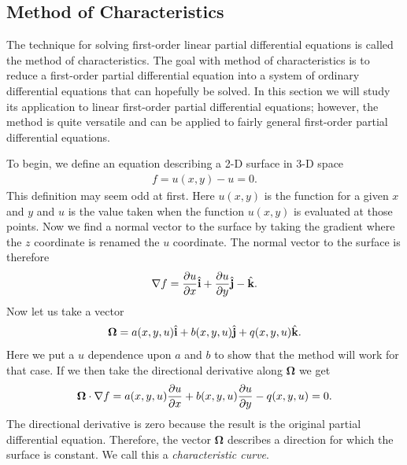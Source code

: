 \subsection{Method of Characteristics}

The technique for solving first-order linear partial differential equations is called the method of characteristics. The goal with method of characteristics is to reduce a first-order partial differential equation into a system of ordinary differential equations that can hopefully be solved. In this section we will study its application to linear first-order partial differential equations; however, the method is quite versatile and can be applied to fairly general first-order partial differential equations.

To begin, we define an equation describing a 2-D surface in 3-D space
\begin{align}
  f = u(x,y) - u = 0.
\end{align}
This definition may seem odd at first. Here $u(x,y)$ is the function for a given $x$ and $y$ and $u$ is the value taken when the function $u(x,y)$ is evaluated at those points. Now we find a normal vector to the surface by taking the gradient where the $z$ coordinate is renamed the $u$ coordinate. The normal vector to the surface is therefore
\begin{align}
  \nabla f = \frac{ \partial {u} }{ \partial {x} } \hat{\mathbf{i}} + \frac{ \partial {u} }{ \partial {y} } \hat{\mathbf{j}} - \hat{\mathbf{k}} .
\end{align}
Now let us take a vector 
\begin{align}
  \boldsymbol\Omega = a(x,y,u) \hat{\mathbf{i}} + b(x,y,u) \hat{\mathbf{j}} + q(x,y,u) \hat{\mathbf{k}} .
\end{align}
Here we put a $u$ dependence upon $a$ and $b$ to show that the method will work for that case. If we then take the directional derivative along $\boldsymbol\Omega$ we get
\begin{align}
  \boldsymbol\Omega \cdot \nabla f = a(x,y,u) \frac{ \partial {u} }{ \partial {x} } + b(x,y,u) \frac{ \partial {u} }{ \partial {y} } - q(x,y,u) = 0 .
\end{align}
The directional derivative is zero because the result is the original partial differential equation. Therefore, the vector $\boldsymbol\Omega$ describes a direction for which the surface is constant. We call this a \emph{characteristic curve}.

